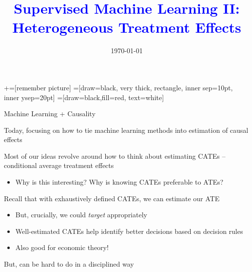 \documentclass[notes,11pt, aspectratio=169]{beamer}
\title[]{\textcolor{blue}{Supervised Machine Learning II: \\ Heterogeneous Treatment Effects}} \author[PGP]{}
\institute[FRBNY]{\small{\begin{tabular}{c}
                           Paul Goldsmith-Pinkham  \\
\end{tabular}}}
\date{\today}
\newenvironment{wideitemize}{\itemize\addtolength{\itemsep}{10pt}}{\enditemize}
\begin{document}
\newcommand\marktopleft[1]{%
    \tikz[overlay,remember picture] 
        \node (marker-#1-a) at (-.3em,.3em) {};%
}
\newcommand\markbottomright[2]{%
    \tikz[overlay,remember picture] 
        \node (marker-#1-b) at (0em,0em) {};%
}
+=[remember picture] 
 =[draw=black, very thick, rectangle, inner sep=10pt, inner ysep=20pt]
 =[draw=black,fill=red, text=white]

\begin{frame}
\maketitle
\end{frame}

\begin{frame}{Machine Learning + Causality}
  \begin{wideitemize}
  \item Today, focusing on how to tie machine learning methods into estimation of causal effects
  \item Most of our ideas revolve around how to think about estimating CATEs -- conditional average treatment effects
    \begin{itemize}
    \item Why is this interesting? Why is knowing CATEs preferable to ATEs?
    \end{itemize}
  \item Recall that with exhaustively defined CATEs, we can estimate our ATE
    \begin{itemize}
    \item But, crucially, we could \emph{target} appropriately
    \item Well-estimated CATEs help identify better decisions based on decision rules
    \item Also good for economic theory!      
    \end{itemize}
  \item But, can be hard to do in a disciplined way
  \end{wideitemize}
\end{frame}
\end{document}
